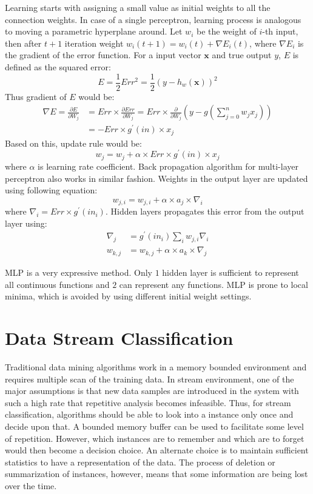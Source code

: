 \documentclass[a4paper, 11pt, oneside]{book}
\begin{document}
Learning starts with assigning a small value as initial weights to all the connection weights. In case of a single perceptron, learning process is analogous to moving a parametric hyperplane around. Let $w_i$ be the weight of $i$-th input, then after $t+1$ iteration weight $w_i(t+1) = w_i(t) + \nabla E_i(t)$, where $\nabla E_i$ is the gradient of the error function. For a input vector $\mathbf{x}$ and true output $y$, $E$ is defined as the squared error:
\[
    E = \frac{1}{2} Err^2 = \frac{1}{2} (y - h_w(\mathbf{x}))^2
\]
Thus gradient of $E$ would be:
\begin{align*}
    \nabla E = \frac{\partial E}{\partial W_j} & = Err \times \frac{\partial Err}{\partial W_j} = Err \times \frac{\partial}{\partial W_j} (y - g(\sum_{j=0}^n w_j x_j)) \\
    & = - Err \times g^{\prime} (in) \times x_j
\end{align*}
Based on this, update rule would be:
\[
    w_j = w_j + \alpha \times Err \times g^{\prime} (in) \times x_j
\]
where $\alpha$ is learning rate coefficient. Back propagation algorithm for multi-layer perceptron also works in similar fashion. Weights in the output layer are updated using following equation:
\[
    w_{j,i} = w_{j,i} + \alpha \times a_j \times \nabla_i
\]
where $\nabla_i = Err \times g^\prime(in_i)$. Hidden layers propagates this error from the output layer using:
\begin{align*}
    \nabla_j &= g^\prime (in_i) \sum_i w_{j,i} \nabla_i \\
    w_{k, j} &= w_{k, j} + \alpha \times a_k \times \nabla_j
\end{align*}

MLP is a very expressive method. Only $1$ hidden layer is sufficient to represent all continuous functions and $2$ can represent any functions. MLP is prone to local minima, which is avoided by using different initial weight settings.

\section{Data Stream Classification}
Traditional data mining algorithms work in a memory bounded environment and requires multiple scan of the training data. In stream environment, one of the major assumptions is that new data samples are introduced in the system with such a high rate that repetitive analysis becomes infeasible. Thus, for stream classification, algorithms should be able to look into a instance only once and decide upon that. A bounded memory buffer can be used to facilitate some level of repetition. However, which instances are to remember and which are to forget would then become a decision choice. An alternate choice is to maintain sufficient statistics to have a representation of the data. The process of deletion or summarization of instances, however, means that some information are being lost over the time.
\end{document}
